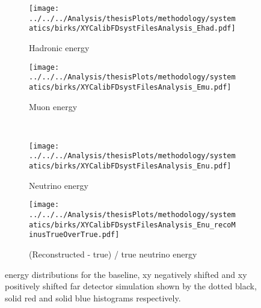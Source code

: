 \begin{figure}%
  \begin{subfigure}{.5\textwidth}
    \centering
    \texttt{[image: ../../../Analysis/thesisPlots/methodology/systematics/birks/XYCalibFDsystFilesAnalysis\_Ehad.pdf]}
    \caption{Hadronic energy}
    \label{fig:systsFDXY_had}
  \end{subfigure}%
  \begin{subfigure}{.5\textwidth}
    \centering
    \texttt{[image: ../../../Analysis/thesisPlots/methodology/systematics/birks/XYCalibFDsystFilesAnalysis\_Emu.pdf]}
    \caption{Muon energy }
    \label{fig:systsFDXY_mu}
  \end{subfigure}\\
  \begin{subfigure}{.5\textwidth}
    \centering
    \texttt{[image: ../../../Analysis/thesisPlots/methodology/systematics/birks/XYCalibFDsystFilesAnalysis\_Enu.pdf]}
    \caption{Neutrino energy}
    \label{fig:systsFDXY_nu}
  \end{subfigure}%
  \begin{subfigure}{.5\textwidth}
    \centering
    \texttt{[image: ../../../Analysis/thesisPlots/methodology/systematics/birks/XYCalibFDsystFilesAnalysis\_Enu\_recoMinusTrueOverTrue.pdf]}
    \caption{(Reconstructed  - true) / true neutrino energy }
    \label{fig:systsFDXY_rmtot}
  \end{subfigure}
  \caption{energy distributions for the baseline, xy negatively
    shifted and xy positively shifted far detector simulation shown
    by the dotted black, solid red and solid blue histograms
    respectively. }
  \label{fig:systsFDXY}
\end{figure}


